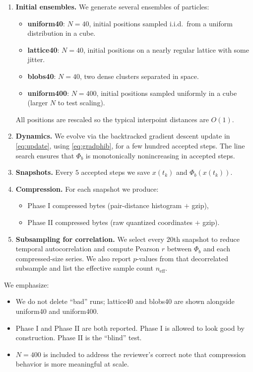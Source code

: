 \documentclass[11pt,a4paper]{article}
\numberwithin{equation}{section}
\newcommand{\phib}{\Phi_b}
\begin{document}
\begin{enumerate}[label=(E\arabic*)]
\item \textbf{Initial ensembles.} We generate several ensembles of particles:
\begin{itemize}
\item \textbf{uniform40}: $N{=}40$, initial positions sampled i.i.d.\ from a uniform distribution in a cube.
\item \textbf{lattice40}: $N{=}40$, initial positions on a nearly regular lattice with some jitter.
\item \textbf{blobs40}: $N{=}40$, two dense clusters separated in space.
\item \textbf{uniform400}: $N{=}400$, initial positions sampled uniformly in a cube (larger $N$ to test scaling).
\end{itemize}
All positions are rescaled so the typical interpoint distances are $O(1)$.

\item \textbf{Dynamics.} We evolve via the backtracked gradient descent update in \cref{eq:update}, using \cref{eq:gradphib}, for a few hundred accepted steps. The line search ensures that $\phib$ is monotonically nonincreasing in accepted steps.

\item \textbf{Snapshots.} Every $5$ accepted steps we save $x(t_k)$ and $\phib(x(t_k))$.

\item \textbf{Compression.} For each snapshot we produce:
\begin{itemize}
\item Phase I compressed bytes (pair-distance histogram $+$ gzip),
\item Phase II compressed bytes (raw quantized coordinates $+$ gzip).
\end{itemize}

\item \textbf{Subsampling for correlation.} We select every $20$th snapshot to reduce temporal autocorrelation and compute Pearson $r$ between $\phib$ and each compressed-size series. We also report $p$-values from that decorrelated subsample and list the effective sample count $n_{\text{eff}}$.

\end{enumerate}

We emphasize:
\begin{itemize}
\item We do not delete ``bad'' runs; lattice40 and blobs40 are shown alongside uniform40 and uniform400.
\item Phase I and Phase II are both reported. Phase I is allowed to look good by construction. Phase II is the ``blind'' test.
\item $N{=}400$ is included to address the reviewer's correct note that compression behavior is more meaningful at scale.
\end{itemize}
\end{document}
